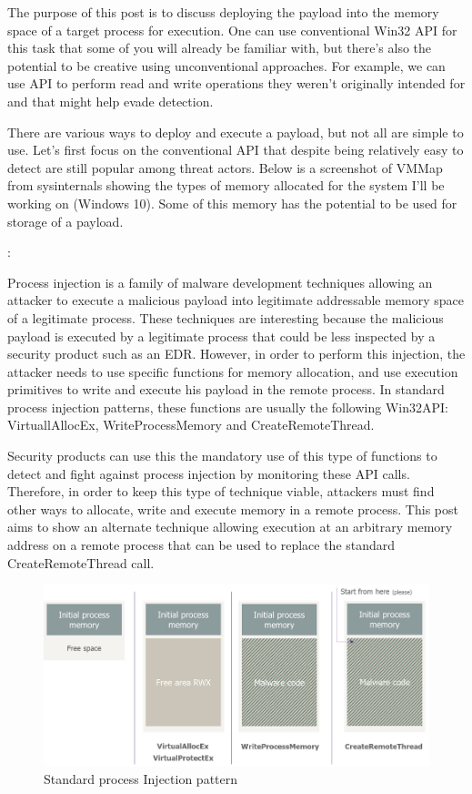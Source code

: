 \documentclass{article}
\begin{document}
The purpose of this post is to discuss deploying the payload into the memory space of a target process for execution. One can use conventional Win32 API for this task that some of you will already be familiar with, but there’s also the potential to be creative using unconventional approaches. For example, we can use API to perform read and write operations they weren’t originally intended for and that might help evade detection.

There are various ways to deploy and execute a payload, but not all are simple to use. Let’s first focus on the conventional API that despite being relatively easy to detect are still popular among threat actors.
Below is a screenshot of VMMap from sysinternals showing the types of memory allocated for the system I’ll be working on (Windows 10). Some of this memory has the potential to be used for storage of a payload.

\textbf{}: \textcite{Dequeker:2023}

Process injection is a family of malware development techniques allowing an attacker to execute a malicious payload into legitimate addressable memory space of a legitimate process.
These techniques are interesting because the malicious payload is executed by a legitimate process that could be less inspected by a security product such as an EDR.
However, in order to perform this injection, the attacker needs to use specific functions for memory allocation, and use execution primitives to write and execute his payload in the remote process. In standard process injection patterns, these functions are usually the following Win32API: VirtuallAllocEx, WriteProcessMemory and CreateRemoteThread.
 
Security products can use this the mandatory use of this type of functions to detect and fight against process injection by monitoring these API calls. Therefore, in order to keep this type of technique viable, attackers must find other ways to allocate, write and execute memory in a remote process.
This post aims to show an alternate technique allowing execution at an arbitrary memory address on a remote process that can be used to replace the standard CreateRemoteThread call.


\begin{figure}[h]
\includegraphics[scale=0.9]{dequeker_standard_process_injection_pattern.png}
\caption{Standard process Injection pattern \autocite{Dequeker:2023}}
\end{figure}
 
\end{document}
